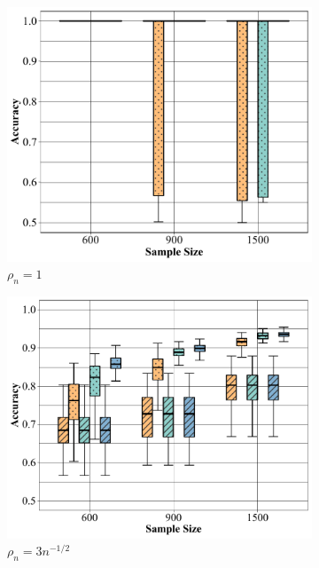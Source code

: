 \documentclass[10pt,journal,compsoc]{IEEEtran}
\numberwithin{equation}{section}
\begin{document}
\begin{figure}[htbp]
\centering
\begin{subfigure}{.6\columnwidth}
\includegraphics[width=\columnwidth]{boxplot/nb_d.pdf} %
\caption{$\rho_n = 1$}
\label{dense:1}
\end{subfigure}
\begin{subfigure}{.6\columnwidth}
\includegraphics[width=\columnwidth]{boxplot/nb_12.pdf}%
\caption{$\rho_n = 3n^{-1/2}$}
\label{12:1}
\end{subfigure}
\begin{subfigure}{.6\columnwidth}

\end{subfigure}
\end{figure}
\end{document}
